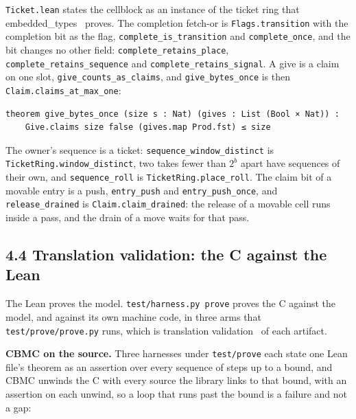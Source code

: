 \texttt{Ticket.\allowbreak{}lean} states the cellblock as an instance of the ticket ring that embedded\_\allowbreak{}types~\cite{src:Turnstile} proves. The completion fetch-or is \texttt{Flags.\allowbreak{}transition} with the completion bit as the flag, \texttt{complete\_\allowbreak{}is\_\allowbreak{}transition} and \texttt{complete\_\allowbreak{}once}, and the bit changes no other field: \texttt{complete\_\allowbreak{}retains\_\allowbreak{}place}, \texttt{complete\_\allowbreak{}retains\_\allowbreak{}sequence} and \texttt{complete\_\allowbreak{}retains\_\allowbreak{}signal}. A give is a claim on one slot, \texttt{give\_\allowbreak{}counts\_\allowbreak{}as\_\allowbreak{}claims}, and \texttt{give\_\allowbreak{}bytes\_\allowbreak{}once} is then \texttt{Claim.\allowbreak{}claims\_\allowbreak{}at\_\allowbreak{}max\_\allowbreak{}one}:

\begin{Verbatim}
theorem give_bytes_once (size s : Nat) (gives : List (Bool × Nat)) :
    Give.claims size false (gives.map Prod.fst) ≤ size
\end{Verbatim}

The owner's sequence is a ticket: \texttt{sequence\_\allowbreak{}window\_\allowbreak{}distinct} is \texttt{Ticket\allowbreak{}Ring.\allowbreak{}window\_\allowbreak{}distinct}, two takes fewer than \(2^b\) apart have sequences of their own, and \texttt{sequence\_\allowbreak{}roll} is \texttt{Ticket\allowbreak{}Ring.\allowbreak{}place\_\allowbreak{}roll}. The claim bit of a movable entry is a push, \texttt{entry\_\allowbreak{}push} and \texttt{entry\_\allowbreak{}push\_\allowbreak{}once}, and \texttt{release\_\allowbreak{}drained} is \texttt{Claim.\allowbreak{}claim\_\allowbreak{}drained}: the release of a movable cell runs inside a pass, and the drain of a move waits for that pass.

\subsection{\texorpdfstring{4.4 Translation validation: the C against the Lean}{4.4 Translation validation: the C against the Lean}}

The Lean proves the model. \texttt{test/\allowbreak{}harness.\allowbreak{}py prove} proves the C against the model, and against its own machine code, in three arms that \texttt{test/\allowbreak{}prove/\allowbreak{}prove.\allowbreak{}py} runs, which is translation validation~\cite{src:TV} of each artifact.

\textbf{CBMC on the source.} Three harnesses under \texttt{test/\allowbreak{}prove} each state one Lean file's theorem as an assertion over every sequence of steps up to a bound, and CBMC unwinds the C with every source the library links to that bound, with an assertion on each unwind, so a loop that runs past the bound is a failure and not a gap:

